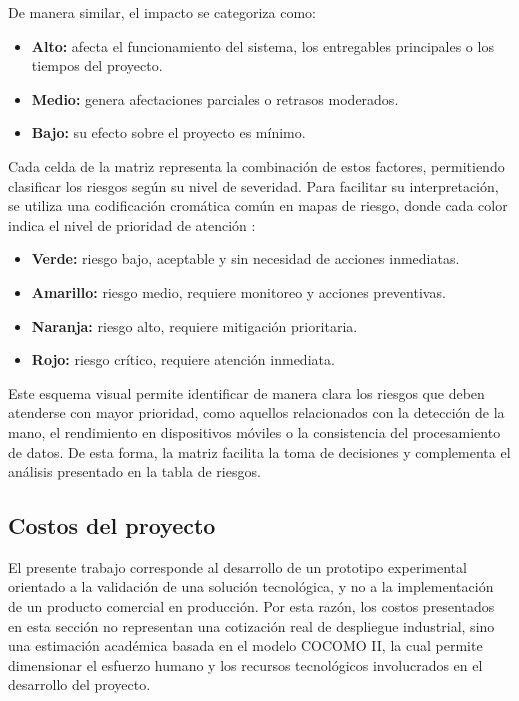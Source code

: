 	De manera similar, el impacto se categoriza como:
	\begin{itemize}
		\item \textbf{Alto:} afecta el funcionamiento del sistema, los entregables principales o los tiempos del proyecto.
		\item \textbf{Medio:} genera afectaciones parciales o retrasos moderados.
		\item \textbf{Bajo:} su efecto sobre el proyecto es mínimo.
	\end{itemize}
	
	Cada celda de la matriz representa la combinación de estos factores, permitiendo clasificar los riesgos según su nivel de severidad. Para facilitar su interpretación, se utiliza una codificación cromática común en mapas de riesgo, donde cada color indica el nivel de prioridad de atención \cite{riskheatmap}:
	
	\begin{itemize}
		\item \textbf{Verde:} riesgo bajo, aceptable y sin necesidad de acciones inmediatas.
		\item \textbf{Amarillo:} riesgo medio, requiere monitoreo y acciones preventivas.
		\item \textbf{Naranja:} riesgo alto, requiere mitigación prioritaria.
		\item \textbf{Rojo:} riesgo crítico, requiere atención inmediata.
	\end{itemize}
	
	Este esquema visual permite identificar de manera clara los riesgos que deben atenderse con mayor prioridad, como aquellos relacionados con la detección de la mano, el rendimiento en dispositivos móviles o la consistencia del procesamiento de datos. De esta forma, la matriz facilita la toma de decisiones y complementa el análisis presentado en la tabla de riesgos.
	
	
	\subsection{Costos del proyecto}
	
	
	El presente trabajo corresponde al desarrollo de un prototipo experimental orientado a la validación de una solución tecnológica, y no a la implementación de un producto comercial en producción. Por esta razón, los costos presentados en esta sección no representan una cotización real de despliegue industrial, sino una estimación académica basada en el modelo COCOMO II, la cual permite dimensionar el esfuerzo humano y los recursos tecnológicos involucrados en el desarrollo del proyecto.
	
